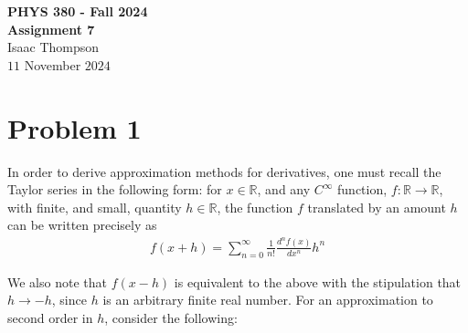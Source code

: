 \documentclass[letter,12pt]{article}
\begin{document}
\begin{center}
{\Large \bf PHYS 380 - Fall 2024}\\
\vspace{10pt}
{\bf Assignment 7}\\
\vspace{10pt}
{Isaac Thompson}\\
\vspace{10pt}
{$11$ November $2024$}
\end{center}
\vspace{0.1in}

\section{Problem 1}
\vspace{0.15in}

\indent In order to derive approximation methods for derivatives, one must recall the Taylor series in the following form: for $x\in\mathbb{R}$, and any $C^{\infty}$ function, $f:\mathbb{R} \to \mathbb{R}$, with finite, and small, quantity $h \in \mathbb{R}$, the function $f$ translated by an amount $h$ can be written precisely as
\begin{align}
f(x+h) = \sum_{n=0}^{\infty} \frac{1}{n!} \frac{d^n f(x)}{dx^n} h^n
\end{align}

\noindent We also note that $f(x-h)$ is equivalent to the above with the stipulation that $h \to -h$, since $h$ is an arbitrary finite real number. For an approximation to second order in $h$, consider the following:
\end{document}
